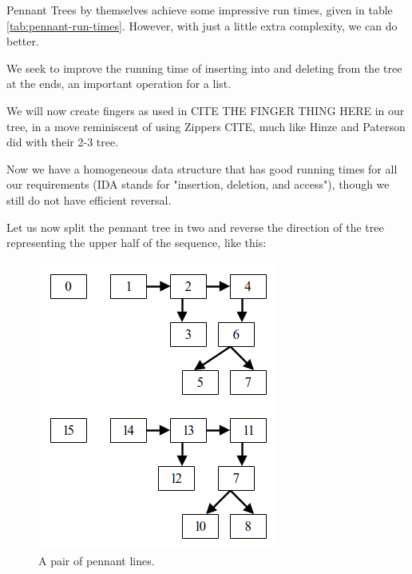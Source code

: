 \documentclass[sigconf]{acmart}
\begin{document}
Pennant Trees by themselves achieve some impressive run times, given in table
\ref{tab:pennant-run-times}. However, with just a little extra complexity, we can
do better.

We seek to improve the running time of inserting into and deleting from the tree
at the ends, an important operation for a list.

We will now create fingers as used in CITE THE FINGER THING HERE in our tree, in
a move reminiscent of using Zippers CITE, much like Hinze and Paterson did with
their 2-3 tree.

Now we have a homogeneous data structure that has good running times for all our
requirements (IDA stands for "insertion, deletion, and access"), though we still
do not have efficient reversal.

Let us now split the pennant tree in two and reverse the direction of the tree
representing the upper half of the sequence, like this:




\begin{figure}
    \label{fig:pennant-lines}
    \caption{A pair of pennant lines.}
    \includegraphics[scale=0.5]{img/pennant-lines}
\end{figure}
\end{document}
